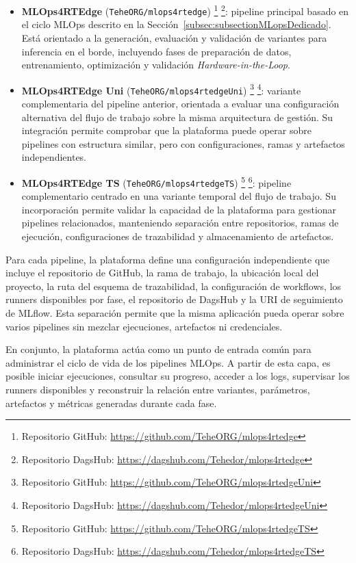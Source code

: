 \begin{itemize}
    \item \textbf{MLOps4RTEdge} (\texttt{TeheORG/mlops4rtedge})%
    \footnote{Repositorio GitHub: \url{https://github.com/TeheORG/mlops4rtedge}}%
    \footnote{Repositorio DagsHub: \url{https://dagshub.com/Tehedor/mlops4rtedge}}:
    pipeline principal basado en el ciclo MLOps descrito en la Sección~\ref{subsec:subsectionMLopsDedicado}. Está orientado a la generación, evaluación y validación de variantes para inferencia en el borde, incluyendo fases de preparación de datos, entrenamiento, optimización y validación \textit{Hardware-in-the-Loop}.

    \item \textbf{MLOps4RTEdge Uni} (\texttt{TeheORG/mlops4rtedgeUni})%
    \footnote{Repositorio GitHub: \url{https://github.com/TeheORG/mlops4rtedgeUni}}%
    \footnote{Repositorio DagsHub: \url{https://dagshub.com/Tehedor/mlops4rtedgeUni}}:
    variante complementaria del pipeline anterior, orientada a evaluar una configuración alternativa del flujo de trabajo sobre la misma arquitectura de gestión. Su integración permite comprobar que la plataforma puede operar sobre pipelines con estructura similar, pero con configuraciones, ramas y artefactos independientes.

    \item \textbf{MLOps4RTEdge TS} (\texttt{TeheORG/mlops4rtedgeTS})%
    \footnote{Repositorio GitHub: \url{https://github.com/TeheORG/mlops4rtedgeTS}}%
    \footnote{Repositorio DagsHub: \url{https://dagshub.com/Tehedor/mlops4rtedgeTS}}:
    pipeline complementario centrado en una variante temporal del flujo de trabajo. Su incorporación permite validar la capacidad de la plataforma para gestionar pipelines relacionados, manteniendo separación entre repositorios, ramas de ejecución, configuraciones de trazabilidad y almacenamiento de artefactos.
\end{itemize}

Para cada pipeline, la plataforma define una configuración independiente que incluye el repositorio de GitHub, la rama de trabajo, la ubicación local del proyecto, la ruta del esquema de trazabilidad, la configuración de workflows, los runners disponibles por fase, el repositorio de DagsHub y la URI de seguimiento de MLflow. Esta separación permite que la misma aplicación pueda operar sobre varios pipelines sin mezclar ejecuciones, artefactos ni credenciales.

En conjunto, la plataforma actúa como un punto de entrada común para administrar el ciclo de vida de los pipelines MLOps. A partir de esta capa, es posible iniciar ejecuciones, consultar su progreso, acceder a los logs, supervisar los runners disponibles y reconstruir la relación entre variantes, parámetros, artefactos y métricas generadas durante cada fase.

